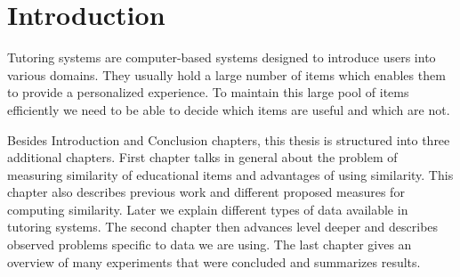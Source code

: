 \documentclass[
  digital, %
  table,   %
  nolof,     %
  nolot,     %
  nocover
]{fithesis3}
\begin{document}
\newcommand{\umimeCesky}{\textit{Umíme česky}}

%
%
%
%
%
%

\chapter*{Introduction}



Tutoring systems are computer-based systems designed to introduce users into various domains. They usually hold a large number of items which enables them to provide a personalized experience. To maintain this large
pool of items efficiently we need to be able to decide which items are
useful and which are not.





Besides Introduction and Conclusion chapters, this thesis is structured
into three additional chapters. First chapter talks in general about the problem of measuring similarity of educational items and advantages of using similarity.
This chapter also describes previous work and different proposed measures for computing similarity. Later we explain different types of data available in tutoring systems.
The second chapter then advances level deeper and describes observed problems specific to data we are using.
The last chapter gives an overview of many experiments that were concluded and summarizes results.
\end{document}
